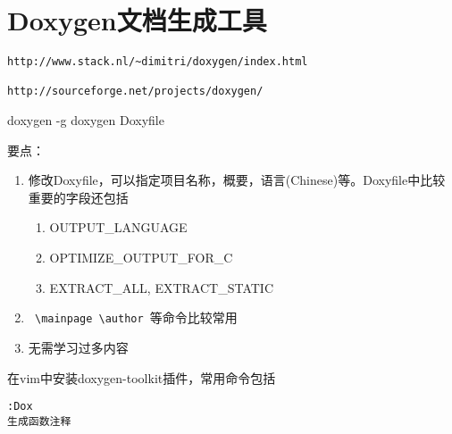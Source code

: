 \section{Doxygen文档生成工具}
\begin{verbatim}
http://www.stack.nl/~dimitri/doxygen/index.html

http://sourceforge.net/projects/doxygen/
\end{verbatim}

\begin{shellcmd}
doxygen -g
doxygen Doxyfile
\end{shellcmd}

要点：
\begin{enumerate}
	\item 修改Doxyfile，可以指定项目名称，概要，语言(Chinese)等。Doxyfile中比较重要的字段还包括
	\begin{enumerate}
		\item OUTPUT\_LANGUAGE
		\item OPTIMIZE\_OUTPUT\_FOR\_C
		\item EXTRACT\_ALL, EXTRACT\_STATIC
	\end{enumerate}
	\item \verb+ \mainpage \author +等命令比较常用
	\item 无需学习过多内容
\end{enumerate}

在vim中安装doxygen-toolkit插件，常用命令包括
\begin{verbatim}
:Dox
生成函数注释
\end{verbatim}

